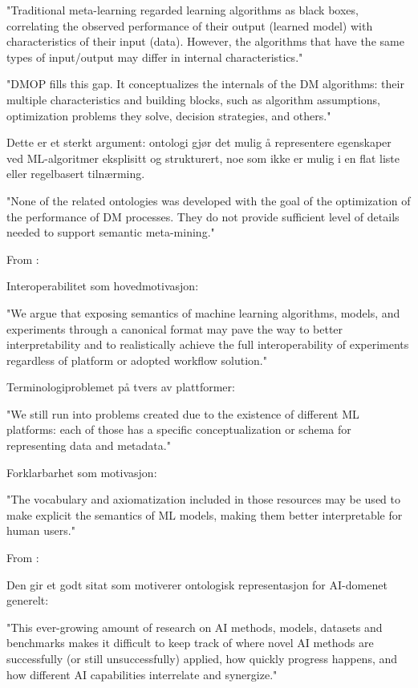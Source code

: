 "Traditional meta-learning regarded learning algorithms as black boxes, correlating the observed performance of their output (learned model) with characteristics of their input (data). However, the algorithms that have the same types of input/output may differ in internal characteristics."

"DMOP fills this gap. It conceptualizes the internals of the DM algorithms: their multiple characteristics and building blocks, such as algorithm assumptions, optimization problems they solve, decision strategies, and others."

Dette er et sterkt argument: ontologi gjør det mulig å representere egenskaper ved ML-algoritmer eksplisitt og strukturert, noe som ikke er mulig i en flat liste eller regelbasert tilnærming.

"None of the related ontologies was developed with the goal of the optimization of the performance of DM processes. They do not provide sufficient level of details needed to support semantic meta-mining."

From \parencite{publio2018ml_schema_exposing_semantics_machine_learning_schemas_ontologies} :

Interoperabilitet som hovedmotivasjon:

"We argue that exposing semantics of machine learning algorithms, models, and experiments through a canonical format may pave the way to better interpretability and to realistically achieve the full interoperability of experiments regardless of platform or adopted workflow solution."

Terminologiproblemet på tvers av plattformer:

"We still run into problems created due to the existence of different ML platforms: each of those has a specific conceptualization or schema for representing data and metadata."

Forklarbarhet som motivasjon:

"The vocabulary and axiomatization included in those resources may be used to make explicit the semantics of ML models, making them better interpretable for human users."

From \parencite{blagec2022_benchmark_knowledge_graph} :

Den gir et godt sitat som motiverer ontologisk representasjon for AI-domenet generelt:

"This ever-growing amount of research on AI methods, models, datasets and benchmarks makes it difficult to keep track of where novel AI methods are successfully (or still unsuccessfully) applied, how quickly progress happens, and how different AI capabilities interrelate and synergize."


